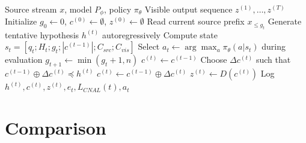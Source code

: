 \documentclass[conference]{IEEEtran}
\begin{document}
\begin{algorithm}[t]
\caption{Stable Prefix Commitment}
\label{alg:ptc}
\begin{algorithmic}[1]
\Require Source stream $x$, model $P_\phi$, policy $\pi_\theta$
\Ensure Visible output sequence $z^{(1)},\ldots,z^{(T)}$
\State Initialize $g_0\gets 0$, $c^{(0)}\gets \emptyset$, $z^{(0)}\gets \emptyset$
    \State Read current source prefix $x_{\le g_t}$
    \State Generate tentative hypothesis $h^{(t)}$ autoregressively
    \State Compute state $s_t=[q_t;H_t;g_t;|c^{(t-1)}|;C_{src};C_{vis}]$
    \State Select $a_t\gets \arg\max_a \pi_\theta(a|s_t)$ during evaluation
        \State $g_{t+1}\gets \min(g_t+1,n)$
        \State $c^{(t)}\gets c^{(t-1)}$
    \Else
        \State Choose $\Delta c^{(t)}$ such that $c^{(t-1)}\oplus \Delta c^{(t)}\preceq h^{(t)}$
        \State $c^{(t)}\gets c^{(t-1)}\oplus \Delta c^{(t)}$
    \EndIf
    \State $z^{(t)}\gets D(c^{(t)})$
    \State Log $h^{(t)},c^{(t)},z^{(t)},e_t,L_{CNAL}(t),a_t$
\EndFor
\end{algorithmic}
\end{algorithm}

\begin{table}[t]
\centering
\caption{Hyperparameters used in the end-term configuration.}
\label{tab:hyperparams}
\end{table}

\section{Comparison}
\end{document}
